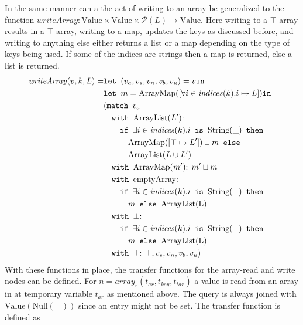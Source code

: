 In the same manner can a the act of writing to an array be generalized to the function $\mathit{writeArray}: \text{Value} \times \text{Value} \times \mathcal{P}(L) \rightarrow \text{Value}$. Here writing to a $\top$ array results in a $\top$ array, writing to a map, updates the keys as discussed before, and writing to anything else either returns a list or a map depending on the type of keys being used. If some of the indices are strings then a map is returned, else a list is returned. 
\begin{align}
\mathit{writeArray}(v, k, L) =       & \texttt{let } (v_a,v_s,v_n,v_b,v_u) = v \texttt{in }\notag\\
                            &\texttt{let } m = \text{ArrayMap}([\forall i \in \mathit{indices}(k). i \mapsto L]) \texttt{in }\notag\\
                            &(\texttt{match }v_a \notag\\
                            & \quad \texttt{with }\text{ArrayList}(L')\text{: } \notag\\
                            &\quad\quad \texttt{if }\exists i \in \mathit{indices}(k).i \texttt{ is } \text{String}(\_)\texttt{ then } \notag\\
                            &\quad\quad\quad \text{ArrayMap}([\top \mapsto L'])\sqcup m \texttt{ else } \notag\\
                            &\quad\quad\quad \text{ArrayList}(L\cup L')\notag\\
                            & \quad \texttt{with }\text{ArrayMap}(m')\text{: } m'\sqcup m\notag\\
                            & \quad \texttt{with }\text{emptyArray}\text{: } \notag\\
                            & \quad\quad\texttt{if }\exists i \in \mathit{indices}(k).i \texttt{ is } \text{String}(\_)\texttt{ then } \notag\\
                            &\quad\quad\quad m \texttt{ else } \text{ArrayList(L)}\notag\\
                            & \quad \texttt{with }\bot\text{: }  \notag\\
                            & \quad\quad\texttt{if }\exists i \in \mathit{indices}(k).i \texttt{ is } \text{String}(\_)\texttt{ then } \notag\\
                            &\quad\quad\quad m \texttt{ else } \text{ArrayList(L)}\notag\\
                            & \quad \texttt{with }\top\text{: } \top, v_s, v_n, v_b, v_u)
\end{align}
With these functions in place, the transfer functions for the array-read and write nodes can be defined. For $n = \mathit{array}_r(t_{ar},t_{key},t_{tar})$ a value is read from an array in at temporary variable $t_{ar}$ as mentioned above. The query is always joined with $\text{Value}(\text{Null}(\top))$ since an entry might not be set. The transfer function is defined as
